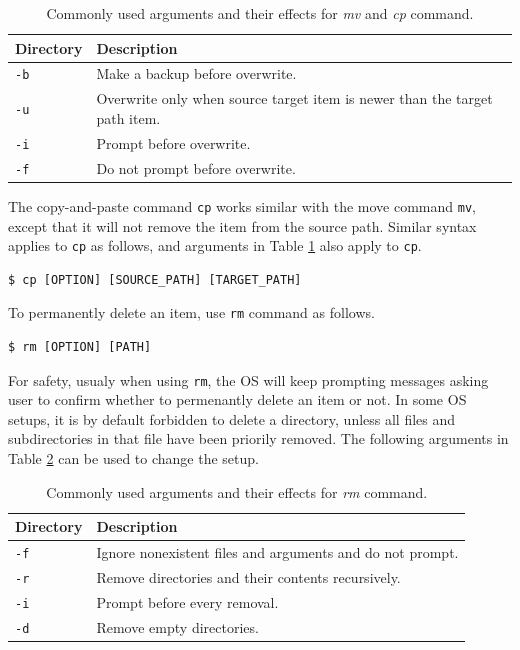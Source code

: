 \begin{table}
  \centering \caption{Commonly used arguments and their effects for \textit{mv} and \textit{cp} command.}\label{ch4tab:mvcpcommandargument}
  \begin{tabularx}{\textwidth}{lX}
    \hline
    Directory & Description \\ \hline
    \verb|-b| & Make a backup before overwrite. \\ \hdashline
    \verb|-u| & Overwrite only when source target item is newer than the target path item. \\ \hdashline
    \verb|-i| & Prompt before overwrite. \\ \hdashline
    \verb|-f| & Do not prompt before overwrite. \\ 
    \hline
  \end{tabularx}
\end{table}

The copy-and-paste command \verb|cp| works similar with the move command \verb|mv|, except that it will not remove the item from the source path. Similar syntax applies to \verb|cp| as follows, and arguments in Table \ref{ch4tab:mvcpcommandargument} also apply to \verb|cp|.
\begin{lstlisting}
$ cp [OPTION] [SOURCE_PATH] [TARGET_PATH]
\end{lstlisting}

To permanently delete an item, use \verb|rm| command as follows.
\begin{lstlisting}
$ rm [OPTION] [PATH]
\end{lstlisting}
For safety, usualy when using \verb|rm|, the OS will keep prompting messages asking user to confirm whether to permenantly delete an item or not. In some OS setups, it is by default forbidden to delete a directory, unless all files and subdirectories in that file have been priorily removed. The following arguments in Table \ref{ch4tab:rmcommandargument} can be used to change the setup.

\begin{table}
  \centering \caption{Commonly used arguments and their effects for \textit{rm} command.}\label{ch4tab:rmcommandargument}
  \begin{tabularx}{\textwidth}{lX}
    \hline
    Directory & Description \\ \hline
    \verb|-f| & Ignore nonexistent files and arguments and do not prompt. \\ \hdashline
    \verb|-r| & Remove directories and their contents recursively. \\ \hdashline
    \verb|-i| & Prompt before every removal. \\ \hdashline
    \verb|-d| & Remove empty directories. \\
    \hline
  \end{tabularx}
\end{table}

